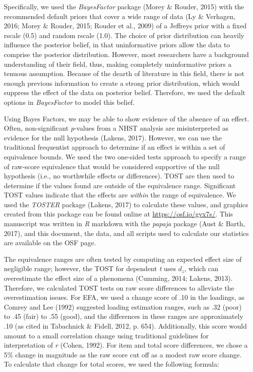 \documentclass[english,man, mask]{apa6}
\theoremstyle{definition}
\theoremstyle{definition}
\theoremstyle{definition}
\theoremstyle{remark}
\begin{document}
Specifically, we used the \emph{BayesFactor} package (Morey \& Rouder,
2015) with the recommended default priors that cover a wide range of
data (Ly \& Verhagen, 2016; Morey \& Rouder, 2015; Rouder et al., 2009)
of a Jeffreys prior with a fixed rscale (0.5) and random rscale (1.0).
The choice of prior distribution can heavily influence the posterior
belief, in that uninformative priors allow the data to comprise the
posterior distribution. However, most researchers have a background
understanding of their field, thus, making completely uninformative
priors a tenuous assumption. Because of the dearth of literature in this
field, there is not enough previous information to create a strong prior
distribution, which would suppress the effect of the data on posterior
belief. Therefore, we used the default options in \emph{BayesFactor} to
model this belief.

Using Bayes Factors, we may be able to show evidence of the absence of
an effect. Often, non-significant \emph{p}-values from a NHST analysis
are misinterpreted as evidence for the null hypothesis (Lakens, 2017).
However, we can use the traditional frequentist approach to determine if
an effect is within a set of equivalence bounds. We used the two
one-sided tests approach to specify a range of raw-score equivalence
that would be considered supportive of the null hypothesis (i.e., no
worthwhile effects or differences). TOST are then used to determine if
the values found are outside of the equivalence range. Significant TOST
values indicate that the effects are \emph{within} the range of
equivalence. We used the \emph{TOSTER} package (Lakens, 2017) to
calculate these values, and graphics created from this package can be
found online at \url{https://osf.io/gvx7s/}. This manuscript was written
in \emph{R} markdown with the \emph{papaja} package (Aust \& Barth,
2017), and this document, the data, and all scripts used to calculate
our statistics are available on the OSF page.

The equivalence ranges are often tested by computing an expected effect
size of negligible range; however, the TOST for dependent \emph{t} uses
\(d_z\), which can overestimate the effect size of a phenomena (Cumming,
2014; Lakens, 2013). Therefore, we calculated TOST tests on raw score
differences to alleviate the overestimation issues. For EFA, we used a
change score of .10 in the loadings, as Comrey and Lee (1992) suggested
loading estimation ranges, such as .32 (poor) to .45 (fair) to .55
(good), and the differences in these ranges are approximately .10 (as
cited in Tabachnick \& Fidell, 2012, p. 654). Additionally, this score
would amount to a small correlation change using traditional guidelines
for interpretation of \emph{r} (Cohen, 1992). For item and total score
differences, we chose a 5\% change in magnitude as the raw score cut off
as a modest raw score change. To calculate that change for total scores,
we used the following formula:
\end{document}
